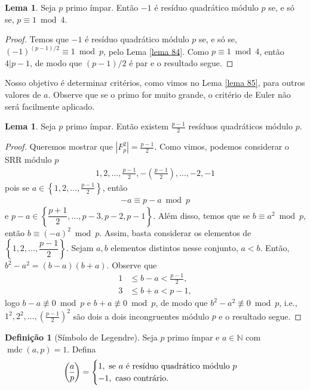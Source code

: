 \documentclass[a4paper,11pt,twoside, leqno]{article}
\DeclareMathOperator{\mdc}{mdc}
\newcommand{\genlegendre}[4]{%
	\genfrac{(}{)}{}{#1}{#3}{#4}%
	\if\relax\detokenize{#2}\relax\else_{\!#2}\fi
}
\newcommand{\legendre}[3][]{\genlegendre{}{#1}{#2}{#3}}
\theoremstyle{definition}
\newtheorem*{definition}{Definição}
\newtheorem{lemma}[theorem]{Lema}
\begin{document}
\begin{lemma}
	\label{lema 85}
	 Seja $p$ primo ímpar. Então $-1$ é resíduo quadrático módulo $p$ se, e só se, $p\equiv 1\bmod 4$.
\end{lemma}
\begin{proof}
	Temos que $-1$ é resíduo quadrático módulo $p$ se, e só se, $(-1)^{(p-1)/2}\equiv 1\bmod p$, pelo Lema \eqref{lema 84}. Como $p\equiv 1\bmod 4$, então $4|p-1$, de modo que $(p-1)/2$ é par e o resultado segue.
\end{proof}
\hspace{12pt} Nosso objetivo é determinar critérios, como vimos no Lema \eqref{lema 85}, para outros valores de $a$. Observe que se o primo for muito grande, o critério de Euler não será facilmente aplicado.
\begin{lemma}
	\label{lema 86}
	Seja $p$ primo ímpar. Então existem $\displaystyle{\frac{p-1}{2}}$ resíduos quadráticos módulo $p$.
\end{lemma}
\begin{proof}
	Queremos mostrar que $\left| F_p^2 \right| = \displaystyle{\frac{p-1}{2}}$. Como vimos, podemos considerar o SRR módulo $p$
	\begin{align*}
	1,2,\dots, \frac{p-1}{2}, -\left(\frac{p-1}{2}\right), \dots, -2, -1
	\end{align*}
	pois se $a\in\left\{ 1,2,\dots,\frac{p-1}{2} \right\}$, então
	\begin{align*}
	-a\equiv p-a\bmod p
	\end{align*}
	e $p-a\in\left\{ \dfrac{p+1}{2}, \dots, p-3, p-2, p-1 \right\}$. Além disso, temos que se $b\equiv a^2\bmod p$, então $b\equiv (-a)^2\bmod p$. Assim, basta considerar os elementos de $\left\{ 1, 2, \dots, \dfrac{p-1}{2} \right\}$. Sejam $a,b$ elementos distintos nesse conjunto, $a<b$. Então, $b^2-a^2 = (b-a)(b+a)$. Observe que
	\begin{align*}
	1&\leq  b-a < \frac{p-1}{2}, \\
	3&\leq  b+a < p-1,
	\end{align*}
	logo $b-a\not\equiv 0\bmod p$ e $b+a\not\equiv 0\bmod p$, de modo que $b^2-a^2\not\equiv 0\bmod p$, i.e., $1^2, 2^2, \dots, \left( \displaystyle{\frac{p-1}{2}} \right)^2$ são dois a dois incongruentes módulo $p$ e o resultado segue.
\end{proof}
\begin{definition}[Símbolo de Legendre]
	Seja $p$ primo ímpar e $a\in\mathbb{N}$ com $\mdc(a,p) = 1$. Defina
	\begin{align*}
	\legendre[]{a}{p} = \begin{cases}
	1, \text{ se } a \text{ é resíduo quadrático módulo } p \\
	-1, \text{ caso contrário.} 
	\end{cases}
	\end{align*}
\end{definition}
\end{document}
